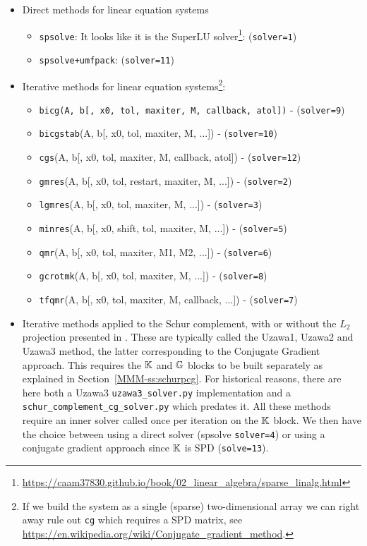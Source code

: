 \begin{itemize}
\item Direct methods for linear equation systems
\begin{itemize}
\item \lstinline{spsolve}: It looks like it is the SuperLU 
solver\footnote{\url{https://caam37830.github.io/book/02_linear_algebra/sparse_linalg.html}}:  (\lstinline{solver=1}) 
\item \lstinline{spsolve+umfpack}: (\lstinline{solver=11}) 
\end{itemize}
\item Iterative methods for linear equation systems\footnote{
If we build the system as a single (sparse) two-dimensional array 
we can right away rule out \lstinline{cg} which requires 
a SPD matrix, see \url{https://en.wikipedia.org/wiki/Conjugate_gradient_method}.}:
\begin{itemize}
\item \lstinline{bicg(A, b[, x0, tol, maxiter, M, callback, atol])} - (\lstinline{solver=9})
\item \lstinline{bicgstab}(A, b[, x0, tol, maxiter, M, ...])        - (\lstinline{solver=10})
\item \lstinline{cgs}(A, b[, x0, tol, maxiter, M, callback, atol])  - (\lstinline{solver=12})
\item \lstinline{gmres}(A, b[, x0, tol, restart, maxiter, M, ...])  - (\lstinline{solver=2})
\item \lstinline{lgmres}(A, b[, x0, tol, maxiter, M, ...])          - (\lstinline{solver=3})
\item \lstinline{minres}(A, b[, x0, shift, tol, maxiter, M, ...])   - (\lstinline{solver=5})
\item \lstinline{qmr}(A, b[, x0, tol, maxiter, M1, M2, ...])        - (\lstinline{solver=6})
\item \lstinline{gcrotmk}(A, b[, x0, tol, maxiter, M, ...])         - (\lstinline{solver=8})
\item \lstinline{tfqmr}(A, b[, x0, tol, maxiter, M, callback, ...]) - (\lstinline{solver=7})
\end{itemize}
\item Iterative methods applied to the Schur complement, with or without the $L_2$
projection presented in \textcite{jalt26}. These are typically called the 
Uzawa1, Uzawa2 and Uzawa3 method, the latter corresponding to the Conjugate Gradient approach.
This requires the ${\mathbb{K}}$ and ${\mathbb{G}}$ blocks to be built separately as explained in Section~\ref{MMM-ss:schurpcg}.
For historical reasons, there are here both a Uzawa3 {\tt uzawa3\_solver.py} implementation and 
a {\tt schur\_complement\_cg\_solver.py} which predates it.
All these methods require an inner solver called once per iteration on the ${\mathbb{K}}$ block.
We then have the choice between using a direct solver (spsolve \lstinline{solver=4}) or using a conjugate gradient
approach since ${\mathbb{K}}$ is SPD (\lstinline{solve=13}). 


\end{itemize}
